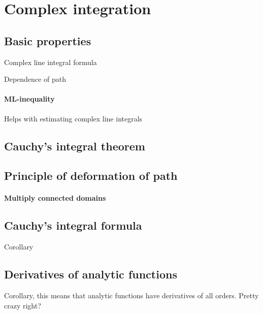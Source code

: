 \section{Complex integration}

\subsection{Basic properties}
Complex line integral formula

Dependence of path

\paragraph{ML-inequality}
Helps with estimating complex line integrals


\subsection{Cauchy's integral theorem}

\subsection{Principle of deformation of path}

\paragraph{Multiply connected domains}

\subsection{Cauchy's integral formula}
Corollary

\subsection{Derivatives of analytic functions}
Corollary, this means that analytic functions have derivatives of all
orders. Pretty crazy right?
